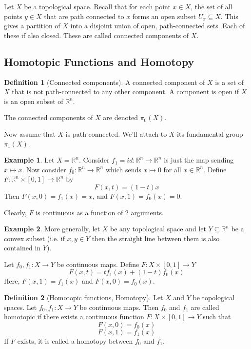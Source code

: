 \documentclass{article}
\theoremstyle{definition}
\newtheorem{defn}{Definition}[section]
\newtheorem{exmp}{Example}[section]
\theoremstyle{plain}%
\theoremstyle{remark}
\newcommand{\R}{\mathbb{R}}
\begin{document}
Let $X$ be a topological space. Recall that for each point $x \in X$, the set of all points $y \in X$ that are path connected to $x$ forms an open subset $U_x \subseteq X$. This gives a partition of $X$ into a disjoint union of open, path-connected sets. Each of these if also closed. These are called connected components of $X$.

\subsection{Homotopic Functions and Homotopy}

\begin{defn}[Connected components]
    A connected component of $X$ is a set of $X$ that is not path-connected to any other component. A component is open if $X$ is an open subset of $\R^n$.
    
    The connected components of $X$ are denoted $\pi_0 (X)$.
\end{defn}

Now assume that $X$ is path-connected. We'll attach to $X$ its fundamental group $\pi_1 (X)$.

\begin{exmp}
    Let $X = \R^n$. Consider $f_1 = id : \R^n \to \R^n$ is just the map sending $x \mapsto x$. Now consider $f_0 : \R^n \to \R^n$ which sends $x \mapsto 0$ for all $x \in \R^n$. Define $F: \R^n \times [0,1] \to \R^n$ by 
    \[F(x,t) = (1-t)x\]
    Then $F(x,0) = f_1(x) = x$, and $F(x, 1) = f_0(x) = 0$.
    
    Clearly, $F$ is continuous as a function of 2 arguments.
\end{exmp}

\begin{exmp}
    More generally, let $X$ be any topological space and let $Y \subseteq \R^n$ be a convex subset (i.e. if $x,y \in Y$ then the straight line between them is also contained in $Y$).
    
    Let $f_0, f_1 : X \to Y$ be continuous maps. Define $F: X \times [0,1] \to Y$
    \[F(x,t) = tf_1(x) + (1-t)f_0(x)\]
    Here, $F(x, 1) = f_1(x)$ and $F(x, 0) = f_0(x)$.
\end{exmp}

\begin{defn}[Homotopic functions, Homotopy]
    Let $X$ and $Y$ be topological spaces. Let $f_0, f_1 : X \to Y$ be continuous maps. Then $f_0$ and $f_1$ are called homotopic if there exists a continuous function $F : X \times [0,1] \to Y$ such that
    \[F(x, 0) = f_0(x)\]
    \[F(x, 1) = f_1(x)\]
    If $F$ exists, it is called a homotopy between $f_0$ and $f_1$.
\end{defn}
\end{document}
